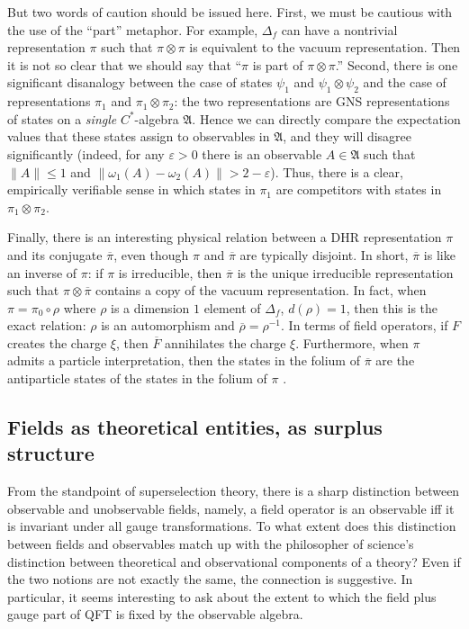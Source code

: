 \documentclass[12pt]{article}
\newcommand{\norm}[1]{\| #1\|}
\theoremstyle{definition}
\theoremstyle{definition}
\theoremstyle{remark}
\def\ol#1{{\overline #1}}
\def\al#1{{\mathfrak #1}}
\def\e{\varepsilon} \def\f{\varphi} \def\k{\kappa} \def\l{\lambda}
\def\om{\omega} \def\Om{\Omega} \def\dd{\partial} \def\D{\Delta}
\begin{document}
But two words of caution should be issued here.  First,
we must be cautious with the use of the ``part''
metaphor.  For example, $\D _f$ can have a nontrivial
representation $\pi$ such that $\pi \otimes \pi$ is
equivalent to the vacuum representation.  Then it is
not so clear that we should say that ``$\pi$ is part of
$\pi \otimes \pi$.''  Second, there is one significant
disanalogy between the case of states $\psi _1$ and
$\psi _1\otimes \psi _2$ and the case of
representations $\pi _1$ and $\pi _1\otimes \pi _2$:
the two representations are GNS representations of
states on a \emph{single} $C^*$-algebra $\al A$.  Hence
we can directly compare the expectation values that
these states assign to observables in $\al A$, and they
will disagree significantly (indeed, for any $\e >0$
there is an observable $A\in \al A$ such that
$\norm{A}\leq 1$ and $\norm{\om _1(A)-\om
  _2(A)}>2-\e$).  Thus, there is a clear, empirically
verifiable sense in which states in $\pi _1$ are
competitors with states in $\pi _1\otimes \pi _2$.

Finally, there is an interesting physical relation between a DHR
representation $\pi$ and its conjugate $\ol \pi$, even though $\pi$
and $\ol \pi$ are typically disjoint.  In short, $\ol \pi$ is like an
inverse of $\pi$: if $\pi$ is irreducible, then $\ol\pi$ is the unique
irreducible representation such that $\pi \otimes \ol\pi$ contains a
copy of the vacuum representation.  In fact, when $\pi =\pi _0\circ
\rho$ where $\rho$ is a dimension $1$ element of $\D _f$, $d(\rho
)=1$, then this is the exact relation: $\rho$ is an automorphism and
$\ol \rho =\rho ^{-1}$.  In terms of field operators, if $F$ creates
the charge $\xi$, then $\ol F$ annihilates the charge $\xi$.
Furthermore, when $\pi$ admits a particle interpretation, then the
states in the folium of $\ol \pi$ are the antiparticle states of the
states in the folium of $\pi$ \cite{dhr2}.

\subsection{Fields as theoretical entities, as surplus structure}

From the standpoint of superselection theory, there is a sharp
distinction between observable and unobservable fields, namely, a
field operator is an observable iff it is invariant under all gauge
transformations.  To what extent does this distinction between fields
and observables match up with the philosopher of science's distinction
between theoretical and observational components of a theory?  Even if
the two notions are not exactly the same, the connection is
suggestive.  In particular, it seems interesting to ask about the
extent to which the field plus gauge part of QFT is fixed by the
observable algebra.
\end{document}
